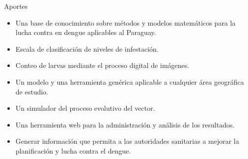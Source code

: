 \begin{frame}[t]{Aportes}
    \begin{itemize}
        \item Una base de conocimiento sobre métodos y modelos matemáticos para la lucha contra en dengue aplicables al Paraguay.
        \item Escala de clasificación de niveles de infestación.
        \item Conteo de larvas mediante el proceso digital de imágenes.
        \item Un modelo y una herramienta genérica aplicable a cualquier área geográfica de estudio.
        \item Un simulador del proceso evolutivo del vector.
        \item Una herramienta web para la administración y análisis de los resultados.
        \item Generar información que permita a las autoridades sanitarias a mejorar la planificación y lucha contra el dengue.
    \end{itemize}
\end{frame}
